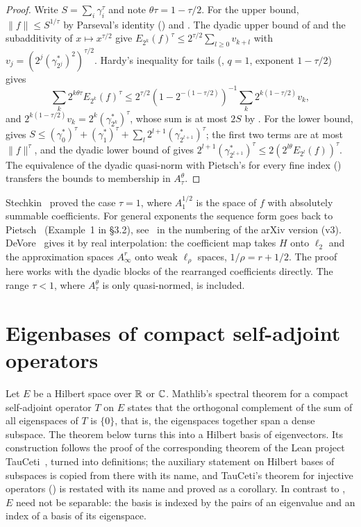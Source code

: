 \begin{proof}
\leanok
Write $S = \sum_i \gamma_i^\tau$ and note $\theta \tau = 1 - \tau/2$. For the upper bound,
$\|f\| \leq S^{1/\tau}$ by Parseval's identity () and
. The dyadic upper
bound of  and the subadditivity of $x \mapsto x^{\tau/2}$ give
$E_{2^k}(f)^\tau \leq 2^{\tau/2} \sum_{l \geq 0} v_{k+l}$ with
$v_j = (2^j (\gamma^*_{2^j})^2)^{\tau/2}$. Hardy's inequality for tails (,
$q = 1$, exponent $1 - \tau/2$) gives
\[
  \sum_k 2^{k\theta\tau} E_{2^k}(f)^\tau \leq 2^{\tau/2} (1 - 2^{-(1 - \tau/2)})^{-1}
  \sum_k 2^{k(1 - \tau/2)} v_k ,
\]
and $2^{k(1-\tau/2)} v_k = 2^k (\gamma^*_{2^k})^\tau$, whose sum is at most $2S$ by
. For the lower bound,
 gives
$S \leq (\gamma^*_0)^\tau + (\gamma^*_1)^\tau + \sum_l 2^{l+1} (\gamma^*_{2^{l+1}})^\tau$; the
first two terms are at most $\|f\|^\tau$, and the dyadic lower bound of
 gives
$2^{l+1} (\gamma^*_{2^{l+1}})^\tau \leq 2 (2^{l\theta} E_{2^l}(f))^\tau$. The equivalence of
the dyadic quasi-norm with Pietsch's for every fine index
() transfers the bounds to membership in $A^\theta_\tau$.
\end{proof}

Stechkin~\cite{Stechkin1955} proved the case $\tau = 1$, where $A^{1/2}_1$ is the space of
$f$ with absolutely summable coefficients. For general exponents the sequence form goes back to
Pietsch~\cite{Pietsch} (Example~1 in \S3.2), see~\cite[Lemma~7.11]{DungTemlyakovUllrich} in
the numbering of the arXiv version (v3).
DeVore~\cite[Theorem~4]{DeVore1998} gives it by real interpolation: the coefficient map takes
$H$ onto $\ell_2$ and the approximation spaces $A^r_\infty$ onto weak $\ell_\rho$ spaces,
$1/\rho = r + 1/2$. The proof here works with the dyadic blocks of the rearranged
coefficients directly. The range $\tau < 1$, where $A^\theta_\tau$ is only quasi-normed, is
included.

\section{Eigenbases of compact self-adjoint operators}
\label{sec:compact-eigenbasis}

Let $E$ be a Hilbert space over $\mathbb{R}$ or $\mathbb{C}$. Mathlib's spectral theorem for a compact
self-adjoint operator $T$ on $E$ states that the orthogonal complement of the sum of all
eigenspaces of $T$ is $\{0\}$, that is, the eigenspaces together span a dense subspace. The
theorem below turns this into a Hilbert basis of eigenvectors. Its construction follows the proof
of the corresponding theorem of the Lean project TauCeti~\cite{TauCeti}, turned into
definitions; the auxiliary statement on Hilbert bases of subspaces is copied from there with its
name, and TauCeti's theorem for injective operators () is
restated with its name and proved as a corollary. In contrast to
\cite[Theorem~6.11, p.~167]{Brezis2011}, $E$ need not be separable: the basis is indexed by the
pairs of an eigenvalue and an index of a basis of its eigenspace.

